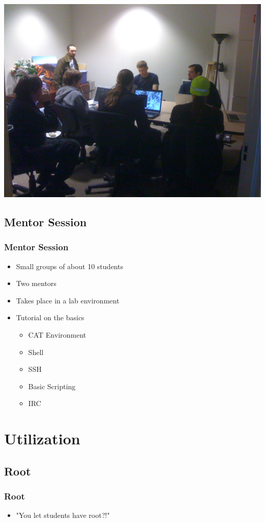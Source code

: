 \documentclass{beamer}
\begin{document}
\frame
{
        \includegraphics[width=1\textwidth]{scratching.jpg}
}


\subsection{Mentor Session}
\frame
{
    \frametitle{Mentor Session}
    \begin{itemize}
        \item Small groups of about 10 students
        \item Two mentors
        \item Takes place in a lab environment
        \item Tutorial on the basics
      \begin{itemize}
          \item CAT Environment
          \item Shell
          \item SSH
          \item Basic Scripting
          \item IRC
      \end{itemize}
    \end{itemize}
}

\section{Utilization}
\subsection{Root}
\frame
{
    \frametitle{Root}
    \begin{itemize}
      \item "You let students have root?!" \\
    \end{itemize}
}
\end{document}
